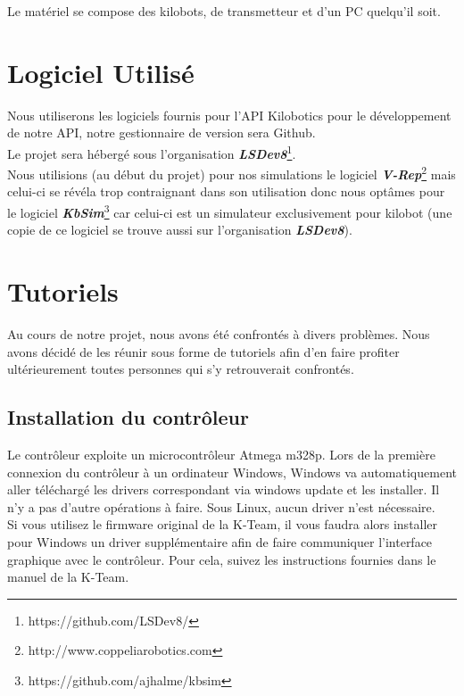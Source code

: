 \documentclass[a4paper,8pt]{report}
\begin{document}
Le mat\'eriel se compose des kilobots, de transmetteur et d'un PC quelqu'il soit.

\section*{Logiciel Utilis\'e}\label{sec:name}

Nous utiliserons les logiciels fournis pour l'API Kilobotics pour le d\'eveloppement de notre API, notre gestionnaire de version sera Github.\\
Le projet sera h\'eberg\'e sous l'organisation \textit{\textbf{LSDev8}}\footnote{https://github.com/LSDev8/}.\\
Nous utilisions (au d\'ebut du projet) pour nos simulations le logiciel \textit{\textbf{V-Rep}}\footnote{http://www.coppeliarobotics.com} mais celui-ci se r\'ev\'ela trop contraignant dans son utilisation donc nous opt\^ames pour le logiciel \textit{\textbf{KbSim}}\footnote{https://github.com/ajhalme/kbsim} car celui-ci est un simulateur exclusivement pour kilobot (une copie de ce logiciel se trouve aussi sur l'organisation \textit{\textbf{LSDev8}}).\\


\section*{Tutoriels}\label{sec:name}

Au cours de notre projet, nous avons été confrontés à divers problèmes. Nous avons décidé de les réunir sous forme de tutoriels afin d'en faire profiter ultérieurement toutes personnes qui s'y retrouverait confrontés.

\subsection*{Installation du contr\^oleur}\label{sec:name}

Le contr\^oleur exploite un microcontr\^oleur Atmega m328p. Lors de la première connexion du contr\^oleur \`a un ordinateur Windows, Windows va automatiquement aller t\'el\'echarg\'e les drivers correspondant via windows update et les installer. Il n'y a pas d'autre op\'erations \`a faire. Sous Linux, aucun driver n'est n\'ecessaire.\\
Si vous utilisez le firmware original de la K-Team, il vous faudra alors installer pour Windows un driver suppl\'ementaire afin de faire communiquer l'interface graphique avec le contr\^oleur. Pour cela, suivez les instructions fournies dans le manuel de la K-Team.
\end{document}
